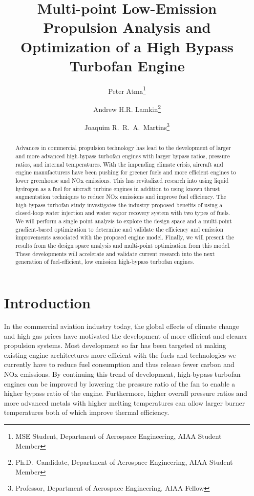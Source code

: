 \documentclass[conf]{new-aiaa}
\title{Multi-point Low-Emission Propulsion Analysis and Optimization of a High Bypass Turbofan Engine} %
\author{Peter Atma\footnote{MSE Student, Department of Aerospace Engineering, AIAA Student Member}}
\author{Andrew H.R. Lamkin\footnote{Ph.D.~Candidate, Department of Aerospace Engineering, AIAA Student Member}}
\author{Joaquim R.~R.~A.~Martins\footnote{Professor, Department of Aerospace Engineering, AIAA Fellow}}
\affil{University of Michigan, Ann Arbor, MI, 48109}
\begin{document}
\maketitle

\begin{abstract}
	Advances in commercial propulsion technology has lead to the development of larger and more advanced high-bypass turbofan engines with larger bypass ratios, pressure ratios, and internal temperatures.
	With the impending climate crisis, aircraft and engine manufacturers have been pushing for greener fuels and more efficient engines to lower greenhouse and NOx emissions.
	This has revitalized research into using liquid hydrogen as a fuel for aircraft turbine engines in addition to using known thrust augmentation techniques to reduce NOx emissions and improve fuel efficiency.
	The high-bypass turbofan study investigates the industry-proposed benefits of using a closed-loop water injection and water vapor recovery system with two types of fuels.
	We will perform a single point analysis to explore the design space and a multi-point gradient-based optimization to determine and validate the efficiency and emission improvements associated with the proposed engine model.
	Finally, we will present the results from the design space analysis and multi-point optimization from this model. These developments will accelerate and validate current research into the next generation of fuel-efficient, low emission high-bypass turbofan engines.
\end{abstract}

\section{Introduction}
In the commercial aviation industry today, the global effects of climate change and high gas prices have motivated the development of more efficient and cleaner propulsion systems.
Most development so far has been targeted at making existing engine architectures more efficient with the fuels and technologies we currently have to reduce fuel consumption and thus release fewer carbon and NOx emissions.
By continuing this trend of development, high-bypass turbofan engines can be improved by lowering the pressure ratio of the fan to enable a higher bypass ratio of the engine.
Furthermore, higher overall pressure ratios and more advanced metals with higher melting temperatures can allow larger burner temperatures both of which improve thermal efficiency.
\end{document}

